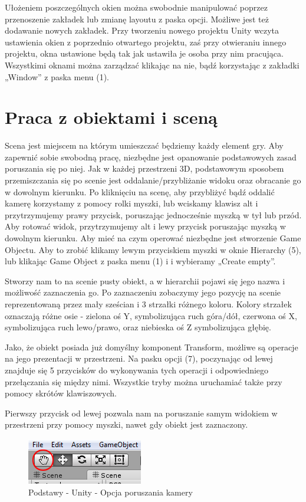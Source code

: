 \documentclass[openright]{xmgr}
\begin{document}
 Ułożeniem poszczególnych okien można swobodnie manipulować poprzez przenoszenie zakładek lub zmianę layoutu z paska opcji. Możliwe jest też dodawanie nowych zakładek. Przy tworzeniu nowego projektu Unity wczyta ustawienia okien z poprzednio otwartego projektu, zaś przy otwieraniu innego projektu, okna ustawione będą tak jak ustawiła je osoba przy nim pracująca. Wszystkimi oknami można zarządzać klikając na nie, bądź korzystając z zakładki „Window” z paska menu (1).
\newpage
\section{Praca z obiektami i sceną}

Scena jest miejscem na którym umieszczać będziemy każdy element gry. Aby zapewnić sobie swobodną pracę, niezbędne jest opanowanie podstawowych zasad poruszania się po niej. Jak w każdej przestrzeni 3D, podstawowym sposobem przemiszczania się po scenie jest oddalanie/przybliżanie widoku oraz obracanie go w dowolnym kierunku. Po kliknięciu na scenę, aby przybliżyć bądź oddalić kamerę korzystamy z pomocy rolki myszki, lub wciskamy klawisz alt i przytrzymujemy prawy przycisk, poruszając jednocześnie myszką w tył lub przód. Aby rotować widok, przytrzymujemy alt i lewy przycisk poruszając myszką w dowolnym kierunku. Aby mieć na czym operować niezbędne jest stworzenie Game Objectu. Aby to zrobić klikamy lewym przyciskiem myszki w oknie Hierarchy (5), lub klikając Game Object z paska menu (1) i i wybieramy „Create empty”.

Stworzy nam to na scenie pusty obiekt, a w hierarchii pojawi się jego nazwa i możliwość zaznaczenia go. Po zaznaczeniu zobaczymy jego pozycję na scenie reprezentowaną przez mały sześcian i 3 strzałki różnego koloru. Kolory strzałek oznaczają różne osie - zielona oś Y, symbolizująca ruch góra/dół, czerwona oś X, symbolizująca ruch lewo/prawo, oraz niebieska oś Z symbolizująca głębię.

Jako, że obiekt posiada już domyślny komponent Transform, możliwe są operacje na jego prezentacji w przestrzeni. Na pasku opcji (7), poczynając od lewej znajduje się 5 przycisków do wykonywania tych operacji i odpowiedniego przełączania się między nimi. Wszystkie tryby można uruchamiać także  przy pomocy skrótów klawiszowych.

Pierwszy przycisk od lewej pozwala nam na poruszanie samym widokiem w przestrzeni przy pomocy myszki, nawet gdy obiekt jest zaznaczony.

\begin{figure}[!htb]
    \begin{center}
    \includegraphics[scale=0.4]{Screeny/rodzial5screeny/drag_option}
    \end{center}
    \caption{Podstawy - Unity - Opcja poruszania kamery}
\end{figure}
\end{document}
